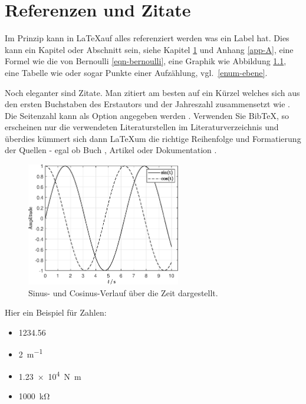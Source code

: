 \chapter{Referenzen und Zitate}\label{cha-ref}

Im Prinzip kann in \LaTeX auf alles referenziert werden was ein Label hat. Dies kann ein Kapitel oder Abschnitt sein, siehe Kapitel \cref{cha-ref} und Anhang \cref{app-A}, eine Formel wie die von Bernoulli \cref{eqn-bernoulli}, eine Graphik wie Abbildung \cref{fig:test_plot_1}, eine Tabelle wie  oder sogar Punkte einer Aufzählung, vgl.~\cref{enum-ebene}.

Noch eleganter sind Zitate. Man zitiert am besten auf ein Kürzel welches sich aus den ersten Buchstaben des Erstautors und der Jahreszahl zusammensetzt wie \cite{Sensoren}. Die Seitenzahl kann als Option angegeben werden \cite{Sensoren}. Verwenden Sie BibTeX, so erscheinen nur die verwendeten Literaturstellen im Literaturverzeichnis und überdies kümmert sich dann \LaTeX um die richtige Reihenfolge und Formatierung der Quellen - egal ob Buch \cite{Sensoren}, Artikel oder Dokumentation \cite{Sensoren}.

\begin{figure}[!ht]
	\centering
	\includegraphics[width=0.6\textwidth]{img/Test_plot_1.eps}
	\caption[60\,\% der Textbreite]{Sinus- und Cosinus-Verlauf über die Zeit dargestellt.}
	\label{fig:test_plot_1}
\end{figure}

Hier ein Beispiel für Zahlen:
\begin{itemize}
	\item \num{1234,56}  %
	\item \SI{2}{\meter^{-1}} %
	\item \SI{1.23e4}{\newton\meter} %
	\item \SI{1000}{\kilo\ohm} %
\end{itemize}


